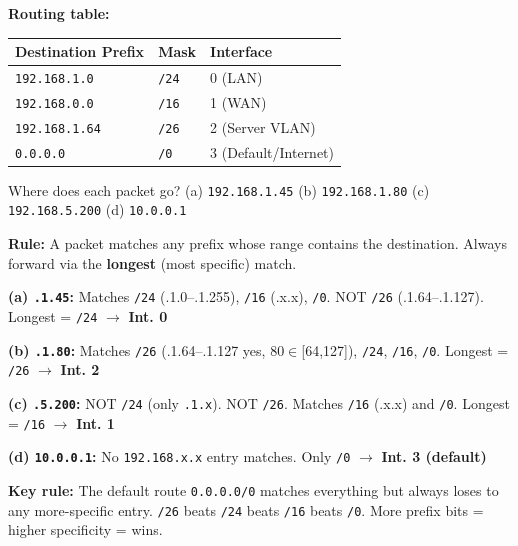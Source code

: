 \documentclass[11pt, letterpaper]{article}
\begin{document}
\vspace{8pt}

\begin{tcolorbox}[colback=partbg, colframe=sectionblue,
  title={\bfseries Problem B2 --- Longest Prefix Match: How a Router Decides}, arc=3pt, boxrule=1pt]
\textbf{Routing table:}
\begin{center}
\renewcommand{\arraystretch}{1.2}
\begin{tabular}{lll}
\toprule
\textbf{Destination Prefix} & \textbf{Mask} & \textbf{Interface} \\
\midrule
\texttt{192.168.1.0}  & \texttt{/24} & 0 (LAN) \\
\texttt{192.168.0.0}  & \texttt{/16} & 1 (WAN) \\
\texttt{192.168.1.64} & \texttt{/26} & 2 (Server VLAN) \\
\texttt{0.0.0.0}      & \texttt{/0}  & 3 (Default/Internet) \\
\bottomrule
\end{tabular}
\end{center}
Where does each packet go?
(a) \texttt{192.168.1.45}\quad
(b) \texttt{192.168.1.80}\quad
(c) \texttt{192.168.5.200}\quad
(d) \texttt{10.0.0.1}
\end{tcolorbox}

\textbf{Rule:} A packet matches any prefix whose range contains the destination.
Always forward via the \textbf{longest} (most specific) match.

\textbf{(a) \texttt{.1.45}:} Matches \texttt{/24} (.1.0--.1.255), \texttt{/16} (.x.x), \texttt{/0}. NOT \texttt{/26} (.1.64--.1.127). Longest = \texttt{/24} $\to$ \textbf{Int. 0}

\textbf{(b) \texttt{.1.80}:} Matches \texttt{/26} (.1.64--.1.127 yes, 80$\in$[64,127]), \texttt{/24}, \texttt{/16}, \texttt{/0}. Longest = \texttt{/26} $\to$ \textbf{Int. 2}

\textbf{(c) \texttt{.5.200}:} NOT \texttt{/24} (only \texttt{.1.x}). NOT \texttt{/26}. Matches \texttt{/16} (.x.x) and \texttt{/0}. Longest = \texttt{/16} $\to$ \textbf{Int. 1}

\textbf{(d) \texttt{10.0.0.1}:} No \texttt{192.168.x.x} entry matches. Only \texttt{/0} $\to$ \textbf{Int. 3 (default)}

\begin{tcolorbox}[colback=partbg, colframe=sectionblue, arc=3pt, boxrule=1pt]
\textbf{Key rule:} The default route \texttt{0.0.0.0/0} matches everything but always
loses to any more-specific entry. \texttt{/26} beats \texttt{/24} beats \texttt{/16} beats
\texttt{/0}. More prefix bits = higher specificity = wins.
\end{tcolorbox}
\end{document}
